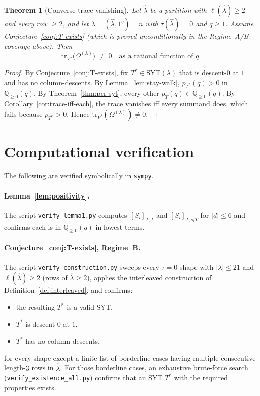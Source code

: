 \documentclass[11pt]{article}
\newtheorem{theorem}{Theorem}
\theoremstyle{definition}
\newcommand{\Vlam}{V^{\lambda}}
\newcommand{\Om}{\Omega}
\newcommand{\hatl}{\widehat\lambda}
\newcommand{\elh}{\ell(\hatl)}
\newcommand{\SYT}{\mathrm{SYT}}
\newcommand{\tr}{\mathrm{tr}}
\newcommand{\Tstar}{T^*}
\begin{document}
\begin{theorem}[Converse trace-vanishing]\label{thm:converse}
Let $\hatl$ be a partition with $\elh \ge 2$ and every row $\ge 2$, and
let $\lambda = (\hatl, 1^q) \vdash n$ with $\tau(\hatl) = 0$ and
$q \ge 1$.  Assume Conjecture~\ref{conj:T-exists} (which is proved
unconditionally in the Regime~A/B coverage above).  Then
\[
   \tr_{\Vlam}\!\bigl(\Om^{(\lambda)}\bigr) \;\ne\; 0
   \quad\text{as a rational function of } q.
\]
\end{theorem}

\begin{proof}
By Conjecture~\ref{conj:T-exists}, fix $\Tstar \in \SYT(\lambda)$ that
is descent-$0$ at $1$ and has no column-descents.  By
Lemma~\ref{lem:stay-walk}, $p_{\Tstar}(q) > 0$ in $\mathbb{Q}_{\ge 0}(q)$.
By Theorem~\ref{thm:per-syt}, every other $p_T(q) \in \mathbb{Q}_{\ge 0}(q)$.
By Corollary~\ref{cor:trace-iff-each}, the trace vanishes iff every
summand does, which fails because $p_{\Tstar} > 0$.  Hence
$\tr_{\Vlam}(\Om^{(\lambda)}) \ne 0$.
\end{proof}

\section{Computational verification}\label{sec:verification}

The following are verified symbolically in \texttt{sympy}.

\paragraph{Lemma~\ref{lem:positivity}.}  The script
\texttt{verify\_lemma1.py} computes $[S_i]_{T,T}$ and $[S_i]_{T, s_i T}$
for $|d| \le 6$ and confirms each is in $\mathbb{Q}_{\ge 0}(q)$ in lowest
terms.

\paragraph{Conjecture~\ref{conj:T-exists}, Regime~B.}  The script
\texttt{verify\_construction.py} sweeps every $\tau = 0$ shape with
$|\lambda| \le 21$ and $\elh \ge 2$ (rows of $\hatl \ge 2$), applies the
interleaved construction of Definition~\ref{def:interleaved}, and
confirms:
\begin{itemize}[topsep=2pt,itemsep=2pt]
\item the resulting $\Tstar$ is a valid SYT,
\item $\Tstar$ is descent-$0$ at $1$,
\item $\Tstar$ has no column-descents,
\end{itemize}
for every shape except a finite list of borderline cases having
multiple consecutive length-$3$ rows in $\hatl$.  For those borderline
cases, an exhaustive brute-force search
(\texttt{verify\_existence\_all.py}) confirms that an SYT $\Tstar$ with
the required properties exists.
\end{document}

